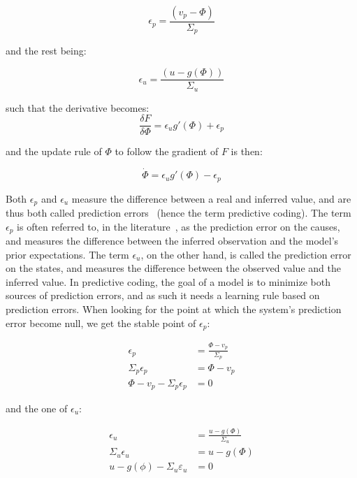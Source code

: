 \begin{equation}
    \epsilon_p = \frac{(v_p-\Phi)}{\Sigma_p} 
\end{equation}

and the rest being:

\begin{equation}
    \epsilon_u = \frac{(u - g(\Phi))}{\Sigma_u}
\end{equation}

such that the derivative becomes:
\begin{equation}
\frac{\delta F}{\delta \Phi} = \epsilon_u  g'(\Phi)   + \epsilon_p 
\end{equation}

and the update rule of $\Phi$ to follow the gradient of $F$ is then:

\begin{equation}
    \dot{\Phi} = \epsilon_u  g'(\Phi) - \epsilon_p
\end{equation}

Both $\epsilon_p$ and $\epsilon_u$ measure the difference between a real and inferred value, and are thus both called prediction errors~\cite{friston2005theory} (hence the term predictive coding). The term $\epsilon_p$ is often referred to, in the literature~\cite{millidge2021predictive}, as the prediction error on the causes, and measures the difference between the inferred observation and the model's prior expectations. The term $\epsilon_u$, on the other hand, is called the prediction error on the states, and measures the difference between the observed value and the inferred value. In predictive coding, the goal of a model is to minimize both sources of prediction errors, and as such it needs a learning rule based on prediction errors. When looking for the point at which the system's prediction error become null, we get the stable point of $\epsilon_p$:

\begin{equation}
    \begin{aligned}
        \epsilon_p &= \frac{\Phi - v_p}{\Sigma_p} \\
        \Sigma_p\epsilon_p &= \Phi - v_p \\
        \Phi - v_p - \Sigma_p\epsilon_p &= 0 
    \end{aligned}
\end{equation}

and the one of $\epsilon_u$:

\begin{equation}
    \begin{aligned}
        \epsilon_u &= \frac{u - g(\Phi)}{\Sigma_u} \\
        \Sigma_u\epsilon_u &= u - g(\Phi)\\
         u - g(\phi) - \varSigma_u \varepsilon_u &= 0
    \end{aligned}
\end{equation}

